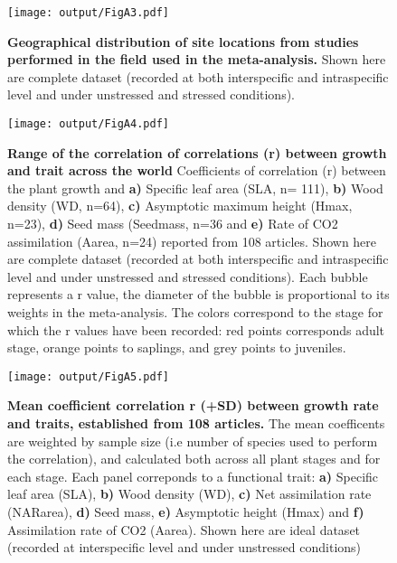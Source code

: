 \documentclass[a4paper]{article}\usepackage[]{graphicx}\usepackage[]{color}
\begin{document}
\begin{Appendix}
\begin{Supplemnetary material}
\begin{figure}[htbp]
\centering
\texttt{[image: output/FigA3.pdf]}
\caption{\textbf{Geographical distribution of site locations from studies performed in the field used in the meta-analysis.} Shown here are complete dataset (recorded at both interspecific and intraspecific level and under unstressed and stressed conditions).}
\label{FigA3}
\end{figure}


\begin{figure}[htbp]
\centering
\texttt{[image: output/FigA4.pdf]}
\caption{\textbf{Range of the correlation of correlations (r) between
growth and trait across the world} Coefficients of correlation (r)
between the plant growth and \textbf{a)} Specific leaf area (SLA, n=
111), \textbf{b)} Wood density (WD, n=64), \textbf{c)} Asymptotic
maximum height (Hmax, n=23), \textbf{d)} Seed mass (Seedmass, n=36 and
\textbf{e)} Rate of CO2 assimilation (Aarea, n=24) reported from 108
articles. Shown here are complete dataset (recorded at both interspecific and intraspecific level and under unstressed and stressed conditions). Each bubble represents a r value, the diameter of the bubble
is proportional to its weights in the meta-analysis. The colors
correspond to the stage for which the r values have been recorded: red
points corresponds adult stage, orange points to saplings, and grey
points to juveniles.}
\label{FigA4}
\end{figure}


\begin{figure}[htbp]
\centering
\texttt{[image: output/FigA5.pdf]}
\caption{\textbf{Mean coefficient correlation r (+SD) between growth
rate and traits, established from 108 articles.} The mean
coefficents are weighted by sample size (i.e number of species used to
perform the correlation), and calculated both across all plant stages
and for each stage. Each panel correponds to a functional trait:
\textbf{a)} Specific leaf area (SLA), \textbf{b)} Wood density (WD),
\textbf{c)} Net assimilation rate (NARarea), \textbf{d)} Seed mass,
\textbf{e)} Asymptotic height (Hmax) and \textbf{f)} Assimilation rate
of CO2 (Aarea). Shown here are ideal dataset (recorded at interspecific level and under unstressed  conditions)}
\label{FigA5}
\end{figure}


\end{Supplemnetary material}
\end{Appendix}
\end{document}
